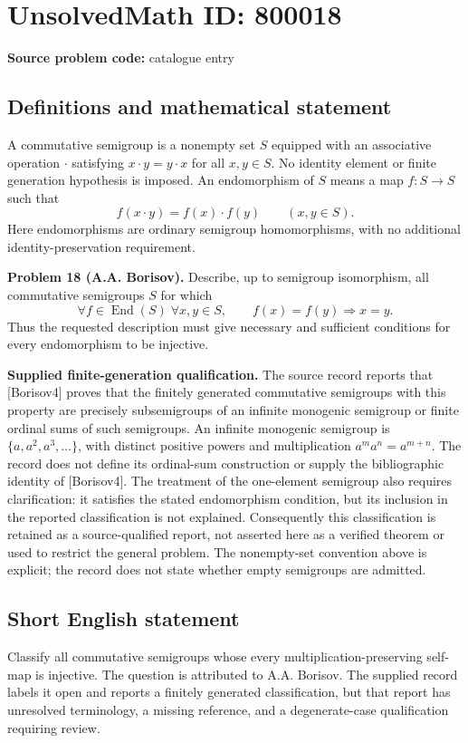 \documentclass[11pt]{article}
\begin{document}
\section*{UnsolvedMath ID: 800018}
\textbf{Source problem code:} catalogue entry
\subsection{Definitions and mathematical statement}
A commutative semigroup is a nonempty set \(S\) equipped with an associative operation \(\cdot\) satisfying \(x\cdot y=y\cdot x\) for all \(x,y\in S\). No identity element or finite generation hypothesis is imposed. An endomorphism of \(S\) means a map \(f:S\to S\) such that
\[
f(x\cdot y)=f(x)\cdot f(y)\qquad(x,y\in S).
\]
Here endomorphisms are ordinary semigroup homomorphisms, with no additional identity-preservation requirement.

\textbf{Problem 18 (A.A. Borisov).} Describe, up to semigroup isomorphism, all commutative semigroups \(S\) for which
\[
\forall f\in\operatorname{End}(S)\;\forall x,y\in S,
\qquad f(x)=f(y)\Longrightarrow x=y.
\]
Thus the requested description must give necessary and sufficient conditions for every endomorphism to be injective.

\textbf{Supplied finite-generation qualification.} The source record reports that [Borisov4] proves that the finitely generated commutative semigroups with this property are precisely subsemigroups of an infinite monogenic semigroup or finite ordinal sums of such semigroups. An infinite monogenic semigroup is \(\{a,a^2,a^3,\ldots\}\), with distinct positive powers and multiplication \(a^ma^n=a^{m+n}\). The record does not define its ordinal-sum construction or supply the bibliographic identity of [Borisov4]. The treatment of the one-element semigroup also requires clarification: it satisfies the stated endomorphism condition, but its inclusion in the reported classification is not explained. Consequently this classification is retained as a source-qualified report, not asserted here as a verified theorem or used to restrict the general problem. The nonempty-set convention above is explicit; the record does not state whether empty semigroups are admitted.
\subsection{Short English statement}
Classify all commutative semigroups whose every multiplication-preserving self-map is injective. The question is attributed to A.A. Borisov. The supplied record labels it open and reports a finitely generated classification, but that report has unresolved terminology, a missing reference, and a degenerate-case qualification requiring review.
\end{document}
